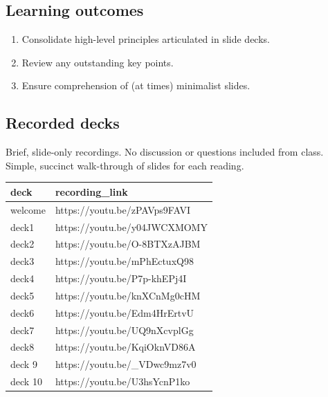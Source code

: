 \documentclass[
]{book}
\providecommand{\tightlist}{%
  \setlength{\itemsep}{0pt}\setlength{\parskip}{0pt}}
\begin{document}
\hypertarget{learning-outcomes-4}{%
\subsection*{Learning outcomes}\label{learning-outcomes-4}}

\begin{enumerate}
\def\labelenumi{\arabic{enumi}.}
\tightlist
\item
  Consolidate high-level principles articulated in slide decks.\\
\item
  Review any outstanding key points.\\
\item
  Ensure comprehension of (at times) minimalist slides.
\end{enumerate}

\hypertarget{recorded-decks}{%
\subsection*{Recorded decks}\label{recorded-decks}}

Brief, slide-only recordings. No discussion or questions included from class. Simple, succinct walk-through of slides for each reading.

\begin{tabular}{ll}
\toprule
deck & recording\_link\\
\midrule
welcome & https://youtu.be/zPAVps9FAVI\\
deck1 & https://youtu.be/y04JWCXMOMY\\
deck2 & https://youtu.be/O-8BTXzAJBM\\
deck3 & https://youtu.be/mPhEctuxQ98\\
deck4 & https://youtu.be/P7p-khEPj4I\\
\addlinespace
deck5 & https://youtu.be/knXCnMg0cHM\\
deck6 & https://youtu.be/Edm4HrErtvU\\
deck7 & https://youtu.be/UQ9nXcvplGg\\
deck8 & https://youtu.be/KqiOknVD86A\\
deck 9 & https://youtu.be/\_VDwc9mz7v0\\
\addlinespace
deck 10 & https://youtu.be/U3hsYcnP1ko\\
\bottomrule
\end{tabular}

  
\end{document}
